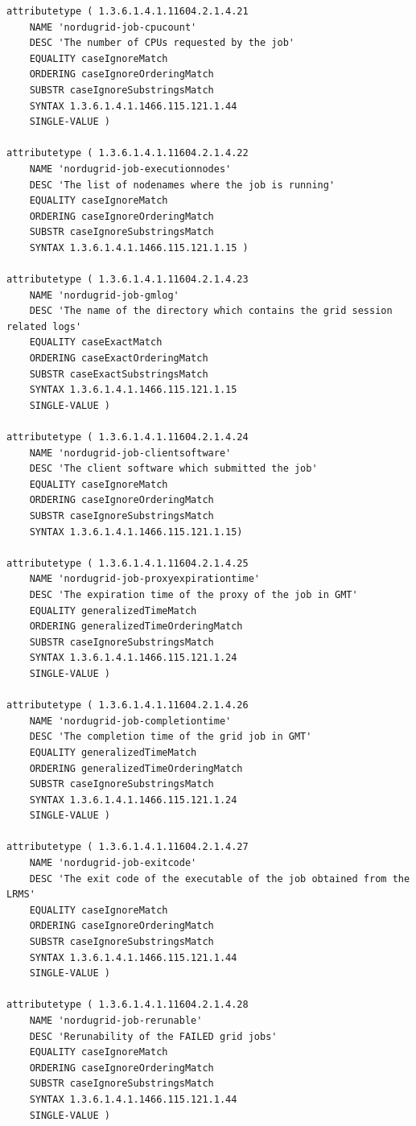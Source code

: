 \documentclass{article}
\begin{document}
\begin{verbatim}
attributetype ( 1.3.6.1.4.1.11604.2.1.4.21
    NAME 'nordugrid-job-cpucount'
    DESC 'The number of CPUs requested by the job'
    EQUALITY caseIgnoreMatch
    ORDERING caseIgnoreOrderingMatch
    SUBSTR caseIgnoreSubstringsMatch
    SYNTAX 1.3.6.1.4.1.1466.115.121.1.44
    SINGLE-VALUE )    
     
attributetype ( 1.3.6.1.4.1.11604.2.1.4.22
    NAME 'nordugrid-job-executionnodes'
    DESC 'The list of nodenames where the job is running'
    EQUALITY caseIgnoreMatch
    ORDERING caseIgnoreOrderingMatch
    SUBSTR caseIgnoreSubstringsMatch
    SYNTAX 1.3.6.1.4.1.1466.115.121.1.15 )       
       
attributetype ( 1.3.6.1.4.1.11604.2.1.4.23
    NAME 'nordugrid-job-gmlog'
    DESC 'The name of the directory which contains the grid session related logs'
    EQUALITY caseExactMatch
    ORDERING caseExactOrderingMatch
    SUBSTR caseExactSubstringsMatch
    SYNTAX 1.3.6.1.4.1.1466.115.121.1.15
    SINGLE-VALUE )
    
attributetype ( 1.3.6.1.4.1.11604.2.1.4.24
    NAME 'nordugrid-job-clientsoftware'
    DESC 'The client software which submitted the job'
    EQUALITY caseIgnoreMatch
    ORDERING caseIgnoreOrderingMatch
    SUBSTR caseIgnoreSubstringsMatch
    SYNTAX 1.3.6.1.4.1.1466.115.121.1.15)
    
attributetype ( 1.3.6.1.4.1.11604.2.1.4.25
    NAME 'nordugrid-job-proxyexpirationtime'
    DESC 'The expiration time of the proxy of the job in GMT'
    EQUALITY generalizedTimeMatch
    ORDERING generalizedTimeOrderingMatch
    SUBSTR caseIgnoreSubstringsMatch
    SYNTAX 1.3.6.1.4.1.1466.115.121.1.24
    SINGLE-VALUE )    

attributetype ( 1.3.6.1.4.1.11604.2.1.4.26
    NAME 'nordugrid-job-completiontime'
    DESC 'The completion time of the grid job in GMT'
    EQUALITY generalizedTimeMatch
    ORDERING generalizedTimeOrderingMatch
    SUBSTR caseIgnoreSubstringsMatch
    SYNTAX 1.3.6.1.4.1.1466.115.121.1.24
    SINGLE-VALUE )  

attributetype ( 1.3.6.1.4.1.11604.2.1.4.27
    NAME 'nordugrid-job-exitcode'
    DESC 'The exit code of the executable of the job obtained from the LRMS'
    EQUALITY caseIgnoreMatch
    ORDERING caseIgnoreOrderingMatch
    SUBSTR caseIgnoreSubstringsMatch
    SYNTAX 1.3.6.1.4.1.1466.115.121.1.44
    SINGLE-VALUE )

attributetype ( 1.3.6.1.4.1.11604.2.1.4.28
    NAME 'nordugrid-job-rerunable'
    DESC 'Rerunability of the FAILED grid jobs'
    EQUALITY caseIgnoreMatch
    ORDERING caseIgnoreOrderingMatch
    SUBSTR caseIgnoreSubstringsMatch
    SYNTAX 1.3.6.1.4.1.1466.115.121.1.44
    SINGLE-VALUE ) 


\end{verbatim}
\end{document}
